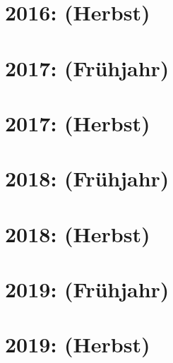 \documentclass{lehramt-informatik-haupt}
\begin{document}
\section{2016: (Herbst)}


\section{2017: (Frühjahr)}


\section{2017: (Herbst)}


\section{2018: (Frühjahr)}


\section{2018: (Herbst)}


\section{2019: (Frühjahr)}


\section{2019: (Herbst)}

\end{document}
